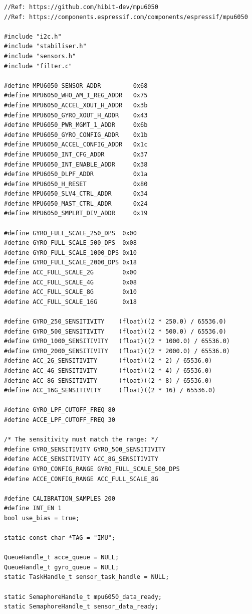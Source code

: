 \begin{lstlisting}
//Ref: https://github.com/hibit-dev/mpu6050
//Ref: https://components.espressif.com/components/espressif/mpu6050

#include "i2c.h"
#include "stabiliser.h"
#include "sensors.h"
#include "filter.c"

#define MPU6050_SENSOR_ADDR         0x68
#define MPU6050_WHO_AM_I_REG_ADDR   0x75
#define MPU6050_ACCEL_XOUT_H_ADDR   0x3b 
#define MPU6050_GYRO_XOUT_H_ADDR    0x43
#define MPU6050_PWR_MGMT_1_ADDR     0x6b 
#define MPU6050_GYRO_CONFIG_ADDR    0x1b
#define MPU6050_ACCEL_CONFIG_ADDR   0x1c
#define MPU6050_INT_CFG_ADDR        0x37
#define MPU6050_INT_ENABLE_ADDR     0x38
#define MPU6050_DLPF_ADDR           0x1a
#define MPU6050_H_RESET             0x80
#define MPU6050_SLV4_CTRL_ADDR      0x34
#define MPU6050_MAST_CTRL_ADDR      0x24
#define MPU6050_SMPLRT_DIV_ADDR     0x19

#define GYRO_FULL_SCALE_250_DPS  0x00
#define GYRO_FULL_SCALE_500_DPS  0x08
#define GYRO_FULL_SCALE_1000_DPS 0x10
#define GYRO_FULL_SCALE_2000_DPS 0x18
#define ACC_FULL_SCALE_2G        0x00
#define ACC_FULL_SCALE_4G        0x08
#define ACC_FULL_SCALE_8G        0x10
#define ACC_FULL_SCALE_16G       0x18

#define GYRO_250_SENSITIVITY    (float)((2 * 250.0) / 65536.0)
#define GYRO_500_SENSITIVITY    (float)((2 * 500.0) / 65536.0)
#define GYRO_1000_SENSITIVITY   (float)((2 * 1000.0) / 65536.0)
#define GYRO_2000_SENSITIVITY   (float)((2 * 2000.0) / 65536.0)
#define ACC_2G_SENSITIVITY      (float)((2 * 2) / 65536.0)
#define ACC_4G_SENSITIVITY      (float)((2 * 4) / 65536.0)
#define ACC_8G_SENSITIVITY      (float)((2 * 8) / 65536.0)
#define ACC_16G_SENSITIVITY     (float)((2 * 16) / 65536.0)

#define GYRO_LPF_CUTOFF_FREQ 80
#define ACCE_LPF_CUTOFF_FREQ 30

/* The sensitivity must match the range: */
#define GYRO_SENSITIVITY GYRO_500_SENSITIVITY
#define ACCE_SENSITIVITY ACC_8G_SENSITIVITY
#define GYRO_CONFIG_RANGE GYRO_FULL_SCALE_500_DPS
#define ACCE_CONFIG_RANGE ACC_FULL_SCALE_8G

#define CALIBRATION_SAMPLES 200
#define INT_EN 1
bool use_bias = true;

static const char *TAG = "IMU";

QueueHandle_t acce_queue = NULL;
QueueHandle_t gyro_queue = NULL;
static TaskHandle_t sensor_task_handle = NULL;

static SemaphoreHandle_t mpu6050_data_ready;
static SemaphoreHandle_t sensor_data_ready;


\end{lstlisting}
